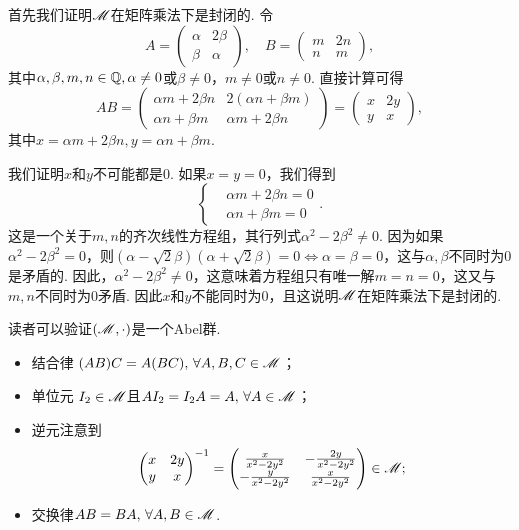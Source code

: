 \begin{solution}
  首先我们证明$\mathscr M$在矩阵乘法下是封闭的. 令
  \[
    A = \begin{pmatrix}
      \alpha & 2\beta \\
      \beta & \alpha
    \end{pmatrix},\quad B = \begin{pmatrix}
      m & 2n \\
      n & m
    \end{pmatrix},
  \]
  其中$\alpha,\beta,m,n\in\mathbb Q,\alpha\ne0$或$\beta\ne0$，$m\ne0$或$n\ne0$. 直接计算可得
  \[
    AB = \begin{pmatrix}
      \alpha m + 2\beta n & 2(\alpha n + \beta m) \\
      \alpha n + \beta m & \alpha m + 2\beta n
    \end{pmatrix} = \begin{pmatrix}
      x & 2y \\
      y & x
    \end{pmatrix},
  \]
  其中$x=\alpha m+2\beta n,y=\alpha n+\beta m$.

  我们证明$x$和$y$不可能都是0. 如果$x=y=0$，我们得到
  \[
    \left\{
      \begin{aligned}
        & \alpha m + 2\beta n = 0\\
        & \alpha n + \beta m = 0
      \end{aligned}
    \right..
  \]
  这是一个关于$m,n$的齐次线性方程组，其行列式$\alpha^2-2\beta^2\ne0$. 因为如果$\alpha^2-2\beta^2=0$，则$(\alpha-\sqrt2\beta)(\alpha+\sqrt2\beta)=0\Leftrightarrow\alpha=\beta=0$，这与$\alpha,\beta$不同时为0是矛盾的. 因此，$\alpha^2-2\beta^2\ne0$，这意味着方程组只有唯一解$m=n=0$，这又与$m,n$不同时为0矛盾. 因此$x$和$y$不能同时为0，且这说明$\mathscr M$在矩阵乘法下是封闭的.

  读者可以验证$(\mathscr M,\cdot)$是一个Abel群.
  \begin{itemize}
    \item {\kaishu 结合律} $(AB)C=A(BC),\,\forall A,B,C\in\mathscr M$；
    \item {\kaishu 单位元} $I_2\in\mathscr M$且$AI_2=I_2A=A,\,\forall A\in\mathscr M$；
    \item {\kaishu 逆元}注意到
    \[
      \begin{pmatrix}
        x & 2y \\
        y & x
      \end{pmatrix}^{-1} = \begin{pmatrix}
        \frac x{x^2-2y^2} & - \frac{2y}{x^2-2y^2} \\
        -\frac{y}{x^2-2y^2} & \frac x{x^2-2y^2}
      \end{pmatrix} \in \mathscr M;
    \]
    \item {\kaishu 交换律}$AB=BA,\,\forall A,B\in\mathscr M$.
  \end{itemize}
\end{solution}

